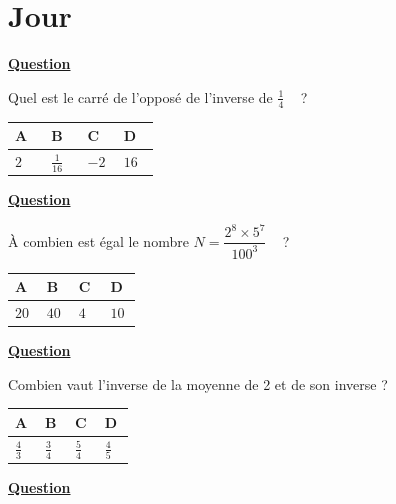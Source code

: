 \documentclass[oneside,12pt]{article}
\let\stdsection\section
\renewcommand{\section}{\stdsection}
\let\oldsection\section
\renewcommand{\section}{\newpage\oldsection}
\begin{document}
\section{Jour }

\underline{\textbf{Question }}

Quel est le carré de l'opposé de l'inverse de $\frac{1}{4}$ ~ ?

\begin{center}
	\renewcommand{\arraystretch}{1.5}
	\begin{tabular}{| P{0.22\linewidth} | P{0.22\linewidth} | P{0.22\linewidth} | P{0.22\linewidth} |} \hline
	A & B & C & D \\ \hline
	\rule{0pt}{5mm}
	$2$ & $\frac{1}{16}$ & $-2$ & $16$ \\ \hline
	\end{tabular}
\end{center}



\underline{\textbf{Question }}

À combien est égal le nombre $N=\dfrac{2^8\times5^7}{100^3}$ ~ ?

\begin{center}
	\renewcommand{\arraystretch}{1.5}
	\begin{tabular}{| P{0.22\linewidth} | P{0.22\linewidth} | P{0.22\linewidth} | P{0.22\linewidth} |} \hline
	A & B & C & D \\ \hline
	\rule{0pt}{5mm}
	$20$ & $40$ & $4$ & $10$ \\ \hline
	\end{tabular}
\end{center}



\underline{\textbf{Question }}

Combien vaut l'inverse de la moyenne de 2 et de son inverse ?

\begin{center}
	\renewcommand{\arraystretch}{1.5}
	\begin{tabular}{| P{0.22\linewidth} | P{0.22\linewidth} | P{0.22\linewidth} | P{0.22\linewidth} |} \hline
	A & B & C & D \\ \hline
	\rule{0pt}{5mm}
	$\frac{4}{3}$ & $\frac{3}{4}$ & $\frac{5}{4}$ & $\frac{4}{5}$ \\ \hline
	\end{tabular}
\end{center}



\underline{\textbf{Question }}
\end{document}

